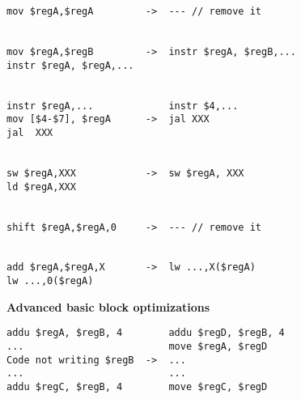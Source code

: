 \documentclass[10pt,a4paper]{article}
\begin{document}
\begin{verbatim}
mov $regA,$regA         ->  --- // remove it


mov $regA,$regB         ->  instr $regA, $regB,...
instr $regA, $regA,...


instr $regA,...             instr $4,...
mov [$4-$7], $regA      ->  jal XXX
jal  XXX


sw $regA,XXX            ->  sw $regA, XXX
ld $regA,XXX


shift $regA,$regA,0     ->  --- // remove it


add $regA,$regA,X       ->  lw ...,X($regA)
lw ...,0($regA)
\end{verbatim}
\textbf{Advanced basic block optimizations}

\begin{verbatim}
addu $regA, $regB, 4        addu $regD, $regB, 4
...                         move $regA, $regD
Code not writing $regB  ->  ...
...                         ...
addu $regC, $regB, 4        move $regC, $regD
\end{verbatim}
\end{document}
